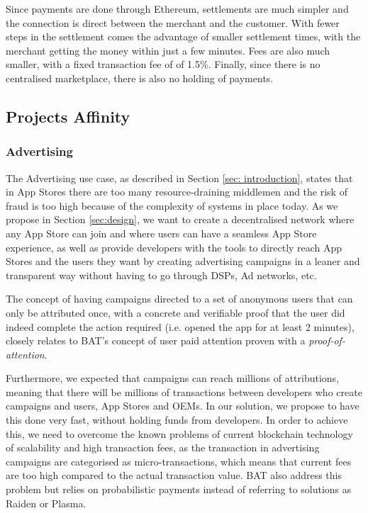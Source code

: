 \medskip

Since payments are done through Ethereum, settlements are much simpler and the connection is direct between the merchant and the customer. With fewer steps in the settlement comes the advantage of smaller settlement times, with the merchant getting the money within just a few minutes. Fees are also much smaller, with a fixed transaction fee of of 1.5\%. Finally, since there is no centralised marketplace, there is also no holding of payments.

\subsection{Projects Affinity}

\subsubsection{Advertising}

The Advertising use case, as described in Section \ref{sec: introduction}, states that in App Stores there are too many resource-draining middlemen and the risk of fraud is too high because of the complexity of systems in place today. As we propose in Section \ref{sec:design}, we want to create a decentralised network where any App Store can join and where users can have a seamless App Store experience, as well as provide developers with the tools to directly reach App Stores and the users they want by creating advertising campaigns in a leaner and transparent way without having to go through DSPs, Ad networks, etc.

\medskip

The concept of having campaigns directed to a set of anonymous users that can only be attributed once, with a concrete and verifiable proof that the user did indeed complete the action required (i.e. opened the app for at least 2 minutes), closely relates to BAT's concept of user paid attention proven with a \textit{proof-of-attention}.

\medskip

Furthermore, we expected that campaigns can reach millions of attributions, meaning that there will be millions of transactions between developers who create campaigns and users, App Stores and OEMs. In our solution, we propose to have this done very fast, without holding funds from developers. In order to achieve this, we need to overcome the known problems of current blockchain technology of scalability and high transaction fees, as the transaction in advertising campaigns are categorised as micro-transactions, which means that current fees are too high compared to the actual transaction value. BAT also address this problem but relies on probabilistic payments \cite{MICROPAY1, MICROPAY2} instead of referring to solutions as Raiden or Plasma.

